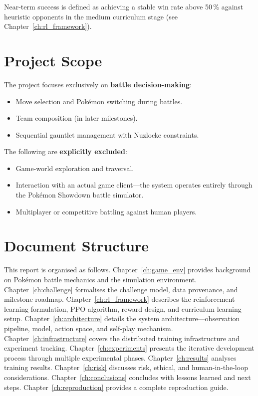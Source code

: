 Near-term success is defined as achieving a stable win rate above 50\,\%
against heuristic opponents in the medium curriculum stage (see
Chapter~\ref{ch:rl_framework}).

\section{Project Scope}

The project focuses exclusively on \textbf{battle decision-making}:

\begin{itemize}
  \item Move selection and Pok\'{e}mon switching during battles.
  \item Team composition (in later milestones).
  \item Sequential gauntlet management with Nuzlocke constraints.
\end{itemize}

The following are \textbf{explicitly excluded}:

\begin{itemize}
  \item Game-world exploration and traversal.
  \item Interaction with an actual game client---the system operates entirely
        through the Pok\'{e}mon Showdown battle simulator.
  \item Multiplayer or competitive battling against human players.
\end{itemize}

\section{Document Structure}

This report is organised as follows.  Chapter~\ref{ch:game_env} provides
background on Pok\'{e}mon battle mechanics and the simulation environment.
Chapter~\ref{ch:challenge} formalises the challenge model, data provenance,
and milestone roadmap.  Chapter~\ref{ch:rl_framework} describes the
reinforcement learning formulation, PPO algorithm, reward design, and
curriculum learning setup.  Chapter~\ref{ch:architecture} details the system
architecture---observation pipeline, model, action space, and self-play
mechanism.  Chapter~\ref{ch:infrastructure} covers the distributed training
infrastructure and experiment tracking.  Chapter~\ref{ch:experiments} presents
the iterative development process through multiple experimental phases.
Chapter~\ref{ch:results} analyses training results.  Chapter~\ref{ch:risk}
discusses risk, ethical, and human-in-the-loop considerations.
Chapter~\ref{ch:conclusions} concludes with lessons learned and next steps.
Chapter~\ref{ch:reproduction} provides a complete reproduction guide.
